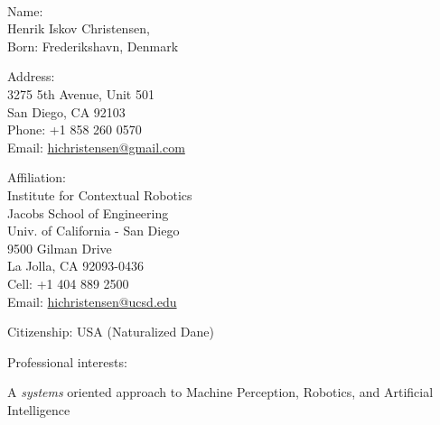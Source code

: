 \documentclass{article}
\begin{document}
\begin{cv}


  \noindent
  \begin{cvlist}{~}
  \item[Name:]\ \\
    Henrik Iskov Christensen,\\
    Born: Frederikshavn, Denmark\\
  \item[Address:]\ \\
    3275 5th Avenue, Unit 501\\
    San Diego, CA 92103\\
    Phone: +1 858 260 0570\\
    Email: \url{hichristensen@gmail.com}\\
  \item[Affiliation:]\ \\
    Institute for Contextual Robotics\\
    Jacobs School of Engineering\\
    Univ. of California - San Diego\\
    9500 Gilman Drive\\
    La Jolla, CA 92093-0436\\
    Cell: +1 404 889 2500\\
    Email: \url{hichristensen@ucsd.edu}\\
  \item[Citizenship:] USA (Naturalized Dane)
  \end{cvlist}

  \begin{cvlist}{Professional interests:}
  \item A {\em systems} oriented approach to Machine Perception,
    Robotics, and Artificial Intelligence
  \end{cvlist}




\end{cv}
\end{document}
